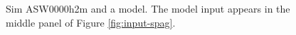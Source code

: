 \documentclass[12pt,preprint]{aastex}
\begin{document}
\begin{figure}
{  }

  \caption[result 7022 (ASW0000h2m)]{Sim ASW0000h2m and a model.  The
    model input appears in the middle panel of Figure
    \ref{fig:input-spag}.}
  \label{fig:7022}
\end{figure}
  
\end{document}
